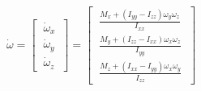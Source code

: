 \documentclass[preview]{standalone}
\begin{document}
\begin{center}
$\dot{\omega} = \begin{bmatrix}\
                \dot{\omega}_x \\\
                \dot{\omega}_y \\\
                \dot{\omega}_z\
            \end{bmatrix} = \begin{bmatrix}\
                \frac{M_x + (I_{yy} - I_{zz})\omega_y\omega_z}{I_{xx}} \\\
                \frac{M_y + (I_{zz} - I_{xx})\omega_x\omega_z}{I_{yy}} \\\
                \frac{M_z + (I_{xx} - I_{yy})\omega_x\omega_y}{I_{zz}}\
            \end{bmatrix}$
\end{center}
\end{document}
